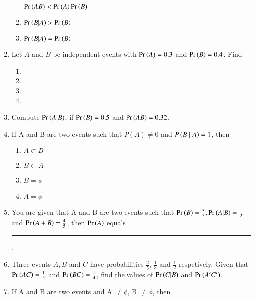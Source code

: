 \begin{enumerate}[label=\thesubsection.\arabic*,ref=\thesubsection.\theenumi,resume*]
\begin{multicols}{2}
\begin{enumerate}
  \label{12.13.6.18.B}
 $\Pr\left(AB\right)< \Pr\left(A\right)\Pr\left(B\right)$
 \item 
 \label{12.13.6.18.C}
 $\Pr\left(B|A\right) > \Pr\left(B\right)$
 \item 
  \label{12.13.6.18.D}
 $\Pr\left(B|A\right) = \Pr\left(B\right)$
 \end{enumerate}
\end{multicols}
\solution 

\item Let  $A$ and $B$ be independent events with $\Pr\left(A\right) = 0.3$ and $\Pr\left(B\right) = 0.4$. Find 
\begin{multicols}{4}
\begin{enumerate}
\item {} \item {}

\item {} \item {}
\end{enumerate}
\end{multicols}
\solution

\item Compute $\Pr\left(A|B\right)$, if $\Pr\left(B\right) = 0.5$ and $\Pr\left(AB\right) = 0.32$.\\
	\solution
	
	\item If A and B are two events such that $P(A) \neq 0$ and $P\left(B\mid A\right) = 1$, then
\begin{multicols}{4}
\begin{enumerate}
\item $A \subset B$
\item $B\subset A$
\item $B = \phi$
\item $A = \phi$
\end{enumerate}
\end{multicols}
		\solution
		
\item You are given that A and B are two events such that $\Pr\left(B\right)=\frac{3}{5},\Pr\left(A|B\right)=\frac{1}{2}$ and $\Pr\left(A+B\right)=\frac{4}{5}$, then $\Pr\left(A\right)$ equals \rule{1cm}{0.1pt}.
	\\
\solution

\item Three events $A, B$ and $C$ have probabilities $\frac{2}{5}$, $\frac{1}{3}$ and $\frac{1}{2}$ respetively. Given that $\Pr\left(AC\right)=\frac{1}{5}$ and $\Pr\left(BC\right)=\frac{1}{4}$, find the values of $\Pr\left(C | B\right)$ and $\Pr\left(A^{\prime} C^{\prime}\right)$.
	\\
\solution

%
\item If A and B are two events and A $\ne \phi$, B $\ne \phi$, then

\end{enumerate}
